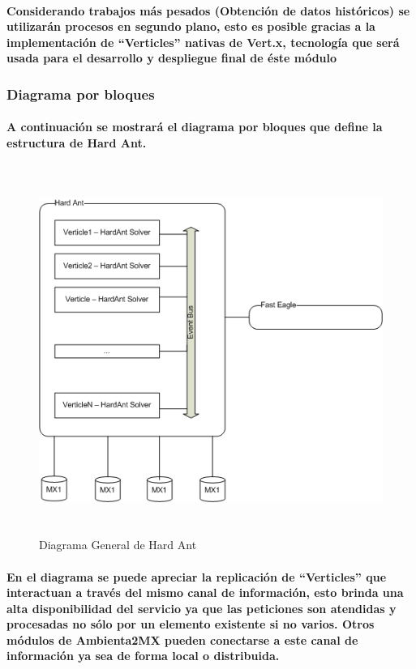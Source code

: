       \paragraph{Considerando trabajos más pesados (Obtención de datos históricos) se utilizarán procesos en segundo plano, esto es posible gracias a la implementación de ``Verticles'' nativas de Vert.x, tecnología que será usada para el desarrollo y despliegue final de éste módulo}
      \newpage
        \begin{landscape}
          \subsubsection{Diagrama por bloques}
          \paragraph{A continuación se mostrará el diagrama por bloques que define la estructura de Hard Ant.}
          \begin{figure}[b!]
          \centering
          \includegraphics[width=17.5cm,height=12cm]{./images/DiagramaHardAnt.png}
          \caption{Diagrama General de Hard Ant}
        \end{figure}
        \end{landscape}
      \newpage
    \paragraph{En el diagrama se puede apreciar la replicación de ``Verticles'' que interactuan a través del mismo canal de información, esto brinda una alta disponibilidad del servicio ya que las peticiones son atendidas y procesadas no sólo por un elemento existente si no varios. Otros módulos de Ambienta2MX pueden conectarse a este canal de información ya sea de forma local o distribuida.}

